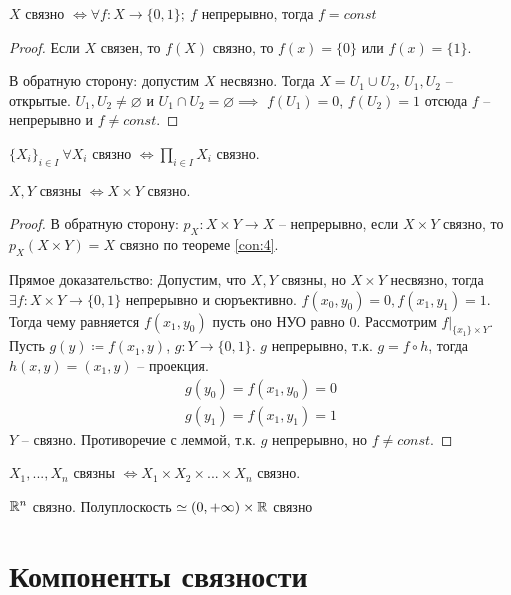 \documentclass[main]{subfiles}
\begin{document}
\begin{lemma}
    $X$ связно $\Leftrightarrow \forall f: X \to \{0, 1\};\ f$ непрерывно, тогда $f = const$
\end{lemma}
\begin{proof}
    Если $X$ связен, то $f(X)$ связно, то $f(x) = \{0\}$ или $f(x) = \{1\}$.

    В обратную сторону: допустим $X$ несвязно.
    Тогда $X = U_1 \cup U_2$, $U_1, U_2$ -- открытые.
    $U_1, U_2 \neq \varnothing$ и $U_1 \cap U_2 = \varnothing \implies$
    $f(U_1) = 0$, $f(U_2) = 1$ отсюда $f$ -- непрерывно и $f \neq const$.
\end{proof}

\begin{theorem}
    $\{X_i\}_{i \in I}\ \forall X_i$ связно $\Leftrightarrow \prod_{i \in I} X_i$ связно.
\end{theorem}
\begin{theorem}
    $X,Y$ связны $\Leftrightarrow X \times Y$ связно.
\end{theorem}
\begin{proof}
    В обратную сторону: $p_X: X\times Y \to X$ -- непрерывно, если $X \times Y$ связно, то $p_X (X\times Y) = X$ связно по теореме \ref{con:4}.

    Прямое доказательство: Допустим, что $X, Y$ связны, но $X \times Y$ несвязно, тогда
    $\exists f: X \times Y \to \{0, 1\}$ непрерывно и сюръективно. $f(x_0, y_0) = 0, f(x_1, y_1) = 1$.
    Тогда чему равняется $f(x_1, y_0)$ пусть оно НУО равно 0.
    Рассмотрим $f \rvert_{\{x_1\} \times Y}$.
    Пусть $g(y) \coloneqq f(x_1, y)$, $g: Y \to \{0,1\}$.
    $g$ непрерывно, т.к. $g = f \circ h$, тогда $h(x,y) = (x_1, y)$ -- проекция.
    \begin{gather*}
        g(y_0) = f(x_1, y_0) = 0\\
        g(y_1) = f(x_1, y_1) = 1
    \end{gather*}
    $Y$ -- связно. Противоречие с леммой, т.к. $g$ непрерывно, но $f \neq const$.
\end{proof}
\begin{corollary}
    $X_1, ..., X_n$ связны $\Leftrightarrow X_1 \times X_2 \times ... \times X_n$ связно.
\end{corollary}
\begin{corollary}
    $\mathbb{R}^n$ связно. Полуплоскость $\simeq (0, +\infty) \times \mathbb{R}$ связно
\end{corollary}

\section{Компоненты связности}
\end{document}
